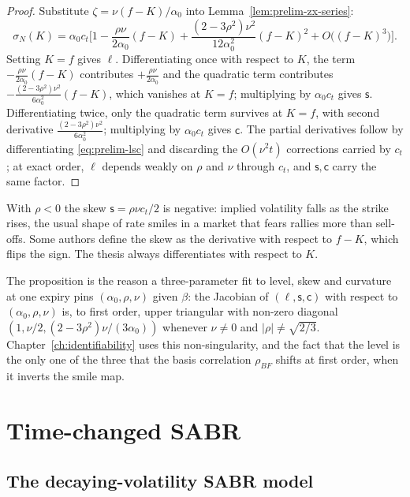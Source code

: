 \documentclass[../../../main.tex]{subfiles}
\begin{document}
\begin{proof}
Substitute $\zeta=\nu(f-K)/\alpha_0$ into Lemma~\ref{lem:prelim-zx-series}:
\[
\sigma_N(K)=\alpha_0c_t\Big[1-\frac{\rho\nu}{2\alpha_0}(f-K)+\frac{(2-3\rho^2)\nu^2}{12\alpha_0^2}(f-K)^2+O\big((f-K)^3\big)\Big].
\]
Setting $K=f$ gives $\ell$. Differentiating once with respect to $K$, the term $-\frac{\rho\nu}{2\alpha_0}(f-K)$ contributes $+\frac{\rho\nu}{2\alpha_0}$ and the quadratic term contributes $-\frac{(2-3\rho^2)\nu^2}{6\alpha_0^2}(f-K)$, which vanishes at $K=f$; multiplying by $\alpha_0c_t$ gives $\mathsf s$. Differentiating twice, only the quadratic term survives at $K=f$, with second derivative $\frac{(2-3\rho^2)\nu^2}{6\alpha_0^2}$; multiplying by $\alpha_0c_t$ gives $\mathsf c$. The partial derivatives follow by differentiating \eqref{eq:prelim-lsc} and discarding the $O(\nu^2t)$ corrections carried by $c_t$; at exact order, $\ell$ depends weakly on $\rho$ and $\nu$ through $c_t$, and $\mathsf s,\mathsf c$ carry the same factor.
\end{proof}

\begin{remark}\label{rem:prelim-skew-sign}
With $\rho<0$ the skew $\mathsf s=\rho\nu c_t/2$ is negative: implied volatility falls as the strike rises, the usual shape of rate smiles in a market that fears rallies more than sell-offs. Some authors define the skew as the derivative with respect to $f-K$, which flips the sign. The thesis always differentiates with respect to $K$.
\end{remark}

The proposition is the reason a three-parameter fit to level, skew and curvature at one expiry pins $(\alpha_0,\rho,\nu)$ given $\beta$: the Jacobian of $(\ell,\mathsf s,\mathsf c)$ with respect to $(\alpha_0,\rho,\nu)$ is, to first order, upper triangular with non-zero diagonal $(1,\nu/2,(2-3\rho^2)\nu/(3\alpha_0))$ whenever $\nu\ne0$ and $|\rho|\neq\sqrt{2/3}$. Chapter~\ref{ch:identifiability} uses this non-singularity, and the fact that the level is the only one of the three that the basis correlation $\rho_{BF}$ shifts at first order, when it inverts the smile map.

\section{Time-changed SABR}\label{sec:prelim-tcsabr}

\subsection{The decaying-volatility SABR model}
\end{document}
